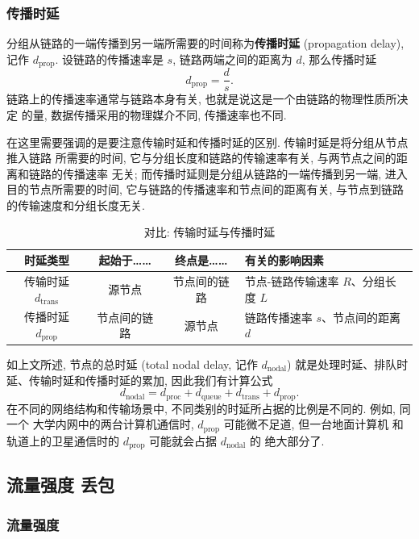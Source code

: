 \documentclass[10pt,UTF8]{book} %
\begin{document}
\subsubsection{传播时延}

分组从链路的一端传播到另一端所需要的时间称为\textbf{传播时延} 
(propagation delay), 记作 $d_\mathrm{prop}$.
设链路的传播速率是 $s$, 链路两端之间的距离为 $d$, 那么传播时延
\[ d_\mathrm{prop} = \dfrac{d}{s}. \]
链路上的传播速率通常与链路本身有关, 也就是说这是一个由链路的物理性质所决定
的量, 数据传播采用的物理媒介不同, 传播速率也不同.

\vspace{1em}

在这里需要强调的是要注意传输时延和传播时延的区别. 传输时延是将分组从节点推入链路
所需要的时间, 它与分组长度和链路的传输速率有关, 与两节点之间的距离和链路的传播速率
无关; 而传播时延则是分组从链路的一端传播到另一端, 进入目的节点所需要的时间,
它与链路的传播速率和节点间的距离有关, 与节点到链路的传输速度和分组长度无关.
\begin{table}[H]
    \centering
    \caption{对比: 传输时延与传播时延}
    \begin{tabular}{cccp{}}
        \hline
        \textbf{时延类型} & \textbf{起始于……} & \textbf{终点是……} & \textbf{有关的影响因素} \\ 
        \hline
        传输时延 $d_\mathrm{trans}$ & 源节点 & 节点间的链路 & 节点-链路传输速率 $R$、分组长度 $L$ \\ 
        传播时延 $d_\mathrm{prop}$ & 节点间的链路 & 源节点 & 链路传播速率 $s$、节点间的距离 $d$ \\
        \hline
    \end{tabular}
\end{table}

如上文所述, 节点的总时延 (total nodal delay, 记作 $d_\mathrm{nodal}$)
就是处理时延、排队时延、传输时延和传播时延的累加,
因此我们有计算公式
\[ d_\mathrm{nodal} = d_\mathrm{proc}
+ d_\mathrm{queue} + d_\mathrm{trans} + d_\mathrm{prop}. \]
在不同的网络结构和传输场景中, 不同类别的时延所占据的比例是不同的. 例如, 同一个
大学内网中的两台计算机通信时, $d_\mathrm{prop}$ 可能微不足道, 但一台地面计算机
和轨道上的卫星通信时的 $d_\mathrm{prop}$ 可能就会占据 $d_\mathrm{nodal}$ 的
绝大部分了.

\subsection{流量强度 \quad 丢包}

\subsubsection{流量强度}
\end{document}

